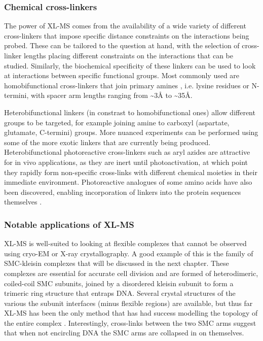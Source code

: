 \documentclass[a4paper,11pt,twoside,openright]{scrbook}
\begin{document}
\subsubsection{Chemical cross-linkers}
The power of XL-MS comes from the availability of a wide variety of different cross-linkers that impose specific distance constraints on the interactions being probed. These can be tailored to the question at hand, with the selection of cross-linker lengths placing different constraints on the interactions that can be studied. Similarly, the biochemical specificity of these linkers can be used to look at interactions between specific functional groups. Most commonly used are homobifunctional cross-linkers that join primary amines \cite{Leitner2016}, i.e. lysine residues or N-termini, with spacer arm lengths ranging from \textasciitilde 3Å to \textasciitilde 35Å.

Heterobifunctional linkers (in constrast to homobifunctional ones) allow different groups to be targeted, for example joining amine to carboxyl (aspartate, glutamate, C-termini) groups. More nuanced experiments can be performed using some of the more exotic linkers that are currently being produced. Heterobifunctional photoreactive cross-linkers such as aryl azides are attractive for in vivo applications, as they are inert until photoactivation, at which point they rapidly form non-specific cross-links with different chemical moieties in their immediate environment. Photoreactive analogues of some amino acids have also been discovered, enabling incorporation of linkers into the protein sequences themselves \cite{Suchanek2005}.


\subsubsection{Notable applications of XL-MS}
XL-MS is well-suited to looking at flexible complexes that cannot be observed using cryo-EM or X-ray crystallography. A good example of this is the family of SMC-kleisin complexes that will be discussed in the next chapter. These complexes are essential for accurate cell division and are formed of heterodimeric, coiled-coil SMC subunits, joined by a disordered kleisin subunit to form a trimeric ring structure that entraps DNA. Several crystal structures of the various the subunit interfaces (minus flexible regions) are available, but thus far XL-MS has been the only method that has had success modelling the topology of the entire complex \cite{Barysz2015}. Interestingly, cross-links between the two SMC arms suggest that when not encircling DNA the SMC arms are collapsed in on themselves.
\end{document}
